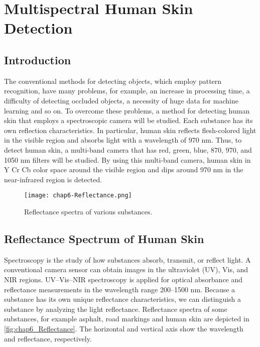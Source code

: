 \chapter{Multispectral Human Skin Detection}%

\label{Chapter5} %


\section{Introduction}
The conventional methods for detecting objects, which employ pattern
recognition, have many problems, for example, an increase in processing time,
a difficulty of detecting occluded objects, a necessity of huge data for machine
learning and so on. To overcome these problems, a method for detecting human skin
that employs a spectroscopic camera will be studied. Each substance has its
own reflection characteristics. In particular, human
skin reflects flesh-colored light in the visible region and
absorbs light with a wavelength of 970 nm. Thus, to detect human skin,
a multi-band camera that has red, green, blue, 870, 970, and 1050 nm filters will be
studied. By using this multi-band camera, human
skin in Y Cr Cb color space around the visible region
and dips around 970 nm in the near-infrared region is detected. \cite{Kanzawa_humanskin}

\begin{figure}[ht]
  \centering
    \texttt{[image: chap6-Reflectance.png]}
  \caption{Reflectance spectra of various substances.}
  \label{fig:chap6_Reflectance}
\end{figure}

\section {Reflectance Spectrum of Human Skin}
Spectroscopy is the study of how substances absorb,
transmit, or reflect light. A conventional camera sensor
can obtain images in the ultraviolet (UV),
Vis, and NIR regions. UV–Vis–NIR spectroscopy is
applied for optical absorbance and reflectance measurements in the wavelength
range 200–1500 nm. Because a substance has its own unique reflectance
characteristics, we can distinguish a substance by analyzing the
light reflectance. Reflectance spectra of some substances, for example
asphalt, road markings and human skin are depicted in \autoref{fig:chap6_Reflectance}.
The horizontal and vertical axis show the wavelength and reflectance, respectively.

